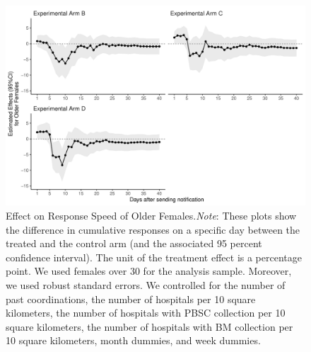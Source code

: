 \documentclass [12pt, a4paper]{article}
\begin{document}
\begin{figure}[H]
\includegraphics{JMDP RCT - Main Document_files/figure-latex/old-female-flow-1} \caption{Effect on Response Speed of Older Females.\newline \emph{Note}: These plots show the difference in cumulative responses on a specific day between the treated and the control arm (and the associated 95 percent confidence interval). The unit of the treatment effect is a percentage point. We used females over 30 for the analysis sample. Moreover, we used robust standard errors. We controlled for the number of past coordinations, the number of hospitals per 10 square kilometers, the number of hospitals with PBSC collection per 10 square kilometers, the number of hospitals with BM collection per 10 square kilometers, month dummies, and week dummies.}\label{fig:old-female-flow}
\end{figure}
\end{document}
